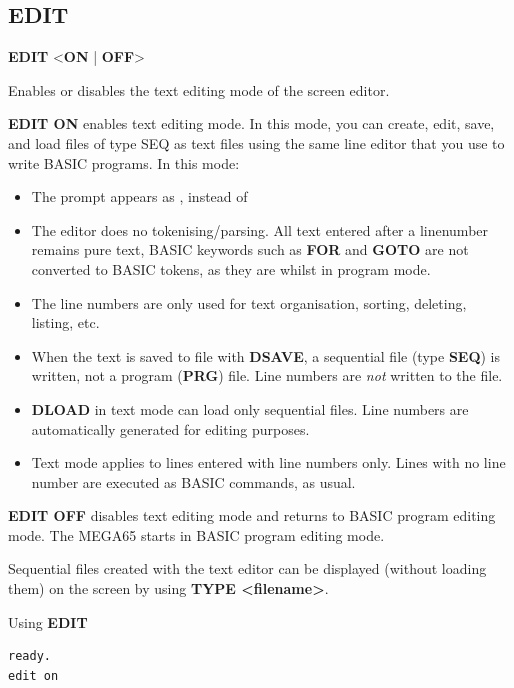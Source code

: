 
\newpage
\subsection{EDIT}
\begin{description}[leftmargin=2cm,style=nextline]
\item [Format:] {\bf EDIT} <{\bf ON} | {\bf OFF}>

\item [Usage:] Enables or disables the text editing mode of the screen editor.

{\bf EDIT ON} enables text editing mode. In this mode, you can create, edit,
save, and load files of type SEQ as text files using the same line editor that
you use to write BASIC programs. In this mode:
\begin{itemize}
\item The prompt appears as , instead of 
\item The editor does no
tokenising/parsing. All text entered after a linenumber remains pure text,
BASIC keywords such as {\bf FOR} and {\bf GOTO} are not converted to BASIC
tokens, as they are whilst in program mode.
\item The line numbers are only used for text organisation,
sorting, deleting, listing, etc.
\item When the text is saved to file with {\bf DSAVE},
a sequential file (type {\bf SEQ}) is written, not a
program ({\bf PRG}) file. Line numbers are {\em not} written to the file.
\item {\bf DLOAD} in text mode can load only sequential files.
Line numbers are automatically generated for editing purposes.
\item Text mode applies to lines entered with line numbers only.
Lines with no line number are executed as BASIC commands,
as usual.
\end{itemize}

{\bf EDIT OFF} disables text editing mode and returns to BASIC program editing
mode. The MEGA65 starts in BASIC program editing mode.

Sequential files created with the text editor can be displayed
(without loading them) on the screen by using {\bf TYPE <filename>}.

\newpage

\item [Example:] Using {\bf EDIT}
\begin{tcolorbox}[colback=black,coltext=white]
\verbatimfont{\codefont}
\begin{verbatim}
ready.
edit on


\end{verbatim}
\end{tcolorbox}
\end{description}

